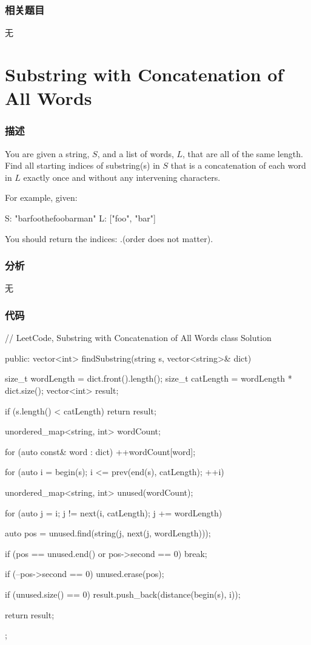 \subsubsection{相关题目}

\begindot
\item 无
\myenddot


\section{Substring with Concatenation of All Words} %
\label{sec:substring-with-concatenation-of-all-words}


\subsubsection{描述}
You are given a string, $S$, and a list of words, $L$, that are all of the same length. Find all starting indices of substring(s) in $S$ that is a concatenation of each word in $L$ exactly once and without any intervening characters.

For example, given: 
\begin{Code}
S: "barfoothefoobarman"
L: ["foo", "bar"]
\end{Code}

You should return the indices: \code{[0,9]}.(order does not matter).


\subsubsection{分析}
无


\subsubsection{代码}
\begin{Code}
// LeetCode, Substring with Concatenation of All Words
class Solution {
public:
    vector<int> findSubstring(string s, vector<string>& dict)
    {
        size_t wordLength = dict.front().length();
        size_t catLength = wordLength * dict.size();
        vector<int> result;

        if (s.length() < catLength) return result;

        unordered_map<string, int> wordCount;

        for (auto const& word : dict) ++wordCount[word];

        for (auto i = begin(s); i <= prev(end(s), catLength); ++i) {
            unordered_map<string, int> unused(wordCount);

            for (auto j = i; j != next(i, catLength); j += wordLength) {
                auto pos = unused.find(string(j, next(j, wordLength)));

                if (pos == unused.end() or pos->second == 0) break;

                if (--pos->second == 0) unused.erase(pos);
            }

            if (unused.size() == 0) result.push_back(distance(begin(s), i));
        }

        return result;
    }
};
\end{Code}


